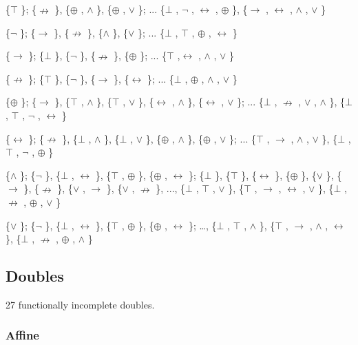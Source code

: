 \{$\top$ \}; \{$\nrightarrow$ \}, \{$\oplus$ , $\land$ \}, \{$\oplus$ , $\lor$ \}; ... \{$\bot$ , $\neg$ , $\leftrightarrow$ , $\oplus$ \}, \{$\to$ , $\leftrightarrow$ , $\land$ , $\lor$ \}

\{$\neg$ \}; \{$\to$ \}, \{$\nrightarrow$ \}, \{$\land$ \}, \{$\lor$ \}; ... \{$\bot$ , $\top$ , $\oplus$ , $\leftrightarrow$ \}

\{$\to$ \}; \{$\bot$ \}, \{$\neg$ \}, \{$\nrightarrow$ \}, \{$\oplus$ \}; ... \{$\top$ ,$\leftrightarrow$ , $\land$ , $\lor$ \}

\{$\nrightarrow$ \}; \{$\top$ \}, \{$\neg$ \}, \{$\to$ \}, \{$\leftrightarrow$ \}; ... \{$\bot$ , $\oplus$ , $\land$ , $\lor$ \}

\{$\oplus$ \}; \{$\to$ \}, \{$\top$ , $\land$ \}, \{$\top$ , $\lor$ \}, \{$\leftrightarrow$ , $\land$ \}, \{$\leftrightarrow$ , $\lor$ \}; ... \{$\bot$ , $\nrightarrow$ , $\lor$ ,
$\land$ \}, \{$\bot$ , $\top$ , $\neg$ , $\leftrightarrow$ \}

\{$\leftrightarrow$ \}; \{$\nrightarrow$ \}, \{$\bot$ , $\land$ \}, \{$\bot$ , $\lor$ \}, \{$\oplus$ , $\land$ \}, \{$\oplus$ , $\lor$ \}; ... \{$\top$ , $\to$ , $\land$ ,
$\lor$ \}, \{$\bot$ , $\top$ , $\neg$ , $\oplus$ \}

\{$\land$ \}; \{$\neg$ \}, \{$\bot$ , $\leftrightarrow$ \}, \{$\top$ , $\oplus$ \}, \{$\oplus$ , $\leftrightarrow$ \}; \{$\bot$ \}, \{$\top$ \}, \{$\leftrightarrow$ \}, \{$\oplus$ \},
\{$\lor$ \}, \{$\to$ \}, \{$\nrightarrow$ \}, \{$\lor$ , $\to$ \}, \{$\lor$ , $\nrightarrow$ \}, ..., \{$\bot$ , $\top$ , $\lor$ \}, \{$\top$ , $\to$ , $\leftrightarrow$ ,
$\lor$ \}, \{$\bot$ , $\nrightarrow$ , $\oplus$ , $\lor$ \}

\{$\lor$ \}; \{$\neg$ \}, \{$\bot$ , $\leftrightarrow$ \}, \{$\top$ , $\oplus$ \}, \{$\oplus$ , $\leftrightarrow$ \}; \ldots, \{$\bot$ , $\top$ , $\land$ \}, \{$\top$ , $\to$ ,
$\land$ , $\leftrightarrow$ \}, \{$\bot$ , $\nrightarrow$ , $\oplus$ , $\land$ \}

\hypertarget{doubles-1}{%
\subsection{Doubles}\label{doubles-1}}

27 functionally incomplete doubles.

\hypertarget{affine}{%
\subsubsection{Affine}\label{affine}}

